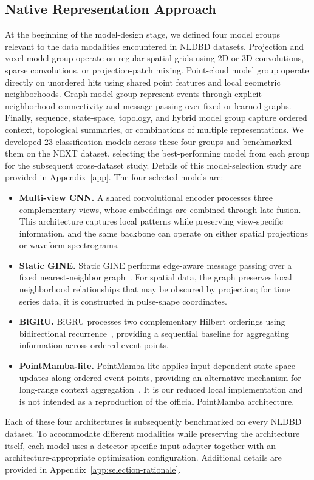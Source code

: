 \subsection{Native Representation Approach}
\label{sec:wing-models}
At the beginning of the model-design stage, we defined four model groups relevant to the data modalities encountered in NLDBD datasets. Projection and voxel model group operate on regular spatial grids using 2D or 3D convolutions, sparse convolutions, or projection-patch mixing. Point-cloud model group operate directly on unordered hits using shared point features and local geometric neighborhoods. Graph model group represent events through explicit neighborhood connectivity and message passing over fixed or learned graphs. Finally, sequence, state-space, topology, and hybrid model group capture ordered context, topological summaries, or combinations of multiple representations. We developed 23 classification models across these four groups and benchmarked them on the NEXT dataset, selecting the best-performing model from each group for the subsequent cross-dataset study. Details of this model-selection study are provided in Appendix~\ref{app}. The four selected models are:


\begin{itemize}
\item \textbf{Multi-view CNN.} A shared convolutional encoder processes three complementary views, whose embeddings are combined through late fusion. This architecture captures local patterns while preserving view-specific information, and the same backbone can operate on either spatial projections or waveform spectrograms.

\item \textbf{Static GINE.} Static GINE performs edge-aware message passing over a fixed nearest-neighbor graph~\citep{wing_xu2019gin}. For spatial data, the graph preserves local neighborhood relationships that may be obscured by projection; for time series data, it is constructed in pulse-shape coordinates.

\item \textbf{BiGRU.} BiGRU processes two complementary Hilbert orderings using bidirectional recurrence~\citep{wing_cho2014gru}, providing a sequential baseline for aggregating information across ordered event points.

\item \textbf{PointMamba-lite.} PointMamba-lite applies input-dependent state-space updates along ordered event points, providing an alternative mechanism for long-range context aggregation~\citep{wing_gu2023mamba,wing_liang2024pointmamba}. It is our reduced local implementation and is not intended as a reproduction of the official PointMamba architecture.

\end{itemize}
Each of these four architectures is subsequently benchmarked on every NLDBD dataset. To accommodate different modalities while preserving the architecture itself, each model uses a detector-specific input adapter together with an architecture-appropriate optimization configuration. Additional details are provided in
Appendix~\ref{app:selection-rationale}.